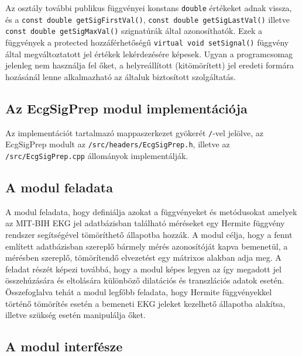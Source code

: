 \documentclass[oneside,titlepage,12pt,a4paper]{report}
\begin{document}
\par Az osztály további publikus függvényei konstans \texttt{double} értékeket adnak vissza, és a \texttt{const double getSigFirstVal()}, \texttt{const double getSigLastVal()} illetve \texttt{const double getSigMaxVal()} szignatúrák által azonosíthatók. Ezek a függvények a protected hozzáférhetőségű \texttt{virtual void setSignal()} függvény által megváltoztatott jel értékek lekérdezésére képesek. Ugyan a programcsomag jelenleg nem használja fel őket, a helyreállított (kitömörített) jel eredeti formára hozásánál lenne alkalmazható az általuk biztosított szolgáltatás.   


\subsection{Az EcgSigPrep modul implementációja} \label{subsec::ecgimpl}

Az implementációt tartalmazó mappaszerkezet gyökerét \texttt{/}-vel jelölve, az EcgSigPrep modult  az \texttt{/src/headers/EcgSigPrep.h}, illetve az \texttt{/src/EcgSigPrep.cpp} állományok implementálják. 

\subsection*{A modul feladata}

\par A modul feladata, hogy definiálja azokat a függvényeket és metódusokat amelyek az MIT-BIH EKG jel adatbázisban található méréseket egy Hermite függvény rendszer segítségével tömöríthető állapotba hozzák. A modul célja, hogy a fennt említett adatbázisban szereplő bármely mérés azonosítóját kapva bemenetül, a mérésben szereplő, tömörítendő elvezetést egy mátrixos alakban adja meg. A feladat részét képezi továbbá, hogy a modul képes legyen az így megadott jel összehúzására és eltolására különböző dilatációs és transzlációs adatok esetén. Összefoglalva tehát a modul legfőbb feladata, hogy Hermite függvényekkel történő tömörítés esetén a bemeneti EKG jeleket kezelhető állapotba alakítsa, illetve szükség esetén manipulálja őket.  

\subsection*{A modul interfésze}
\end{document}
